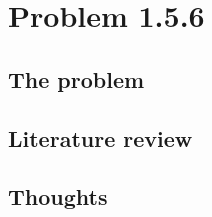 \section{Problem 1.5.6} 

\subsection{The problem}%

\subsection{Literature review} %

\subsection{Thoughts} %

